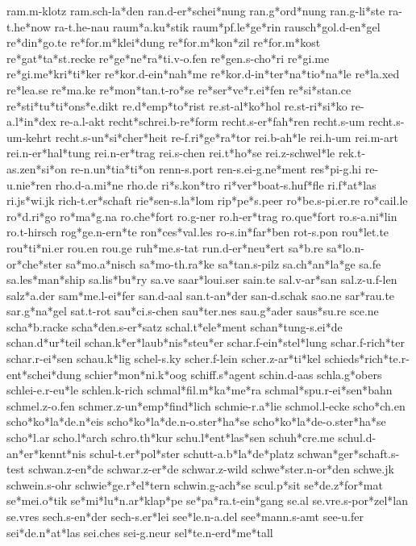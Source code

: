 ram.m-klotz
ram.sch-la*den
ran.d-er*schei*nung
ran.g*ord*nung
ran.g-li*ste
ra-t.he*now
ra-t.he-nau
raum*a.ku*stik
raum*pf.le*ge*rin
rausch*gol.d-en*gel
re*din*go.te
re*for.m*klei*dung
re*for.m*kon*zil
re*for.m*kost
re*gat*ta*st.recke
re*ge*ne*ra*ti.v-o.fen
re*gen.s-cho*ri
re*gi.me
re*gi.me*kri*ti*ker
re*kor.d-ein*nah*me
re*kor.d-in*ter*na*tio*na*le
re*la.xed
re*lea.se
re*ma.ke
re*mon*tan.t-ro*se
re*ser*ve*r.ei*fen
re*si*stan.ce
re*sti*tu*ti*ons*e.dikt
re.d*emp*to*rist
re.st-al*ko*hol
re.st-ri*si*ko
re-a.l*in*dex
re-a.l-akt
recht*schrei.b-re*form
recht.s-er*fah*ren
recht.s-um
recht.s-um-kehrt
recht.s-un*si*cher*heit
re-f.ri*ge*ra*tor
rei.b-ah*le
rei.h-um
rei.m-art
rei.n-er*hal*tung
rei.n-er*trag
rei.s-chen
rei.t*ho*se
rei.z-schwel*le
rek.t-as.zen*si*on
re-n.un*tia*ti*on
renn-s.port
ren-s.ei-g.ne*ment
res*pi-g.hi
re-u.nie*ren
rho.d-a.mi*ne
rho.de
ri*s.kon*tro
ri*ver*boat-s.huf*fle
ri.f*at*las
ri.js*wi.jk
rich-t.er*schaft
rie*sen-s.la*lom
rip*pe*s.peer
ro*be.s-pi.er.re
ro*cail.le
ro*d.ri*go
ro*ma*g.na
ro.che*fort
ro.g-ner
ro.h-er*trag
ro.que*fort
ro.s-a.ni*lin
ro.t-hirsch
rog*ge.n-ern*te
ron*ces*val.les
ro-s.in*far*ben
rot-s.pon
rou*let.te
rou*ti*ni.er
rou.en
rou.ge
ruh*me.s-tat
run.d-er*neu*ert
sa*b.re
sa*lo.n-or*che*ster
sa*mo.a*nisch
sa*mo-th.ra*ke
sa*tan.s-pilz
sa.ch*an*la*ge
sa.fe
sa.les*man*ship
sa.lis*bu*ry
sa.ve
saar*loui.ser
sain.te
sal.v-ar*san
sal.z-u.f-len
salz*a.der
sam*me.l-ei*fer
san.d-aal
san.t-an*der
san-d.schak
sao.ne
sar*rau.te
sar.g*na*gel
sat.t-rot
sau*ci.s-chen
sau*ter.nes
sau.g*ader
saus*su.re
sce.ne
scha*b.racke
scha*den.s-er*satz
schal.t*ele*ment
schan*tung-s.ei*de
schan.d*ur*teil
schan.k*er*laub*nis*steu*er
schar.f-ein*stel*lung
schar.f-rich*ter
schar.r-ei*sen
schau.k*lig
schel-s.ky
scher.f-lein
scher.z-ar*ti*kel
schieds*rich*te.r-ent*schei*dung
schier*mon*ni.k*oog
schiff.s*agent
schin.d-aas
schla.g*obers
schlei-e.r-eu*le
schlen.k-rich
schmal*fil.m*ka*me*ra
schmal*spu.r-ei*sen*bahn
schmel.z-o.fen
schmer.z-un*emp*find*lich
schmie-r.a*lie
schmol.l-ecke
scho*ch.en
scho*ko*la*de.n*eis
scho*ko*la*de.n-o.ster*ha*se
scho*ko*la*de-o.ster*ha*se
scho*l.ar
scho.l*arch
schro.th*kur
schu.l*ent*las*sen
schuh*cre.me
schul.d-an*er*kennt*nis
schul-t.er*pol*ster
schutt-a.b*la*de*platz
schwan*ger*schaft.s-test
schwan.z-en*de
schwar.z-er*de
schwar.z-wild
schwe*ster.n-or*den
schwe.jk
schwein.s-ohr
schwie*ge.r*el*tern
schwin.g-ach*se
scul.p*sit
se*de.z*for*mat
se*mei.o*tik
se*mi*lu*n.ar*klap*pe
se*pa*ra.t-ein*gang
se.al
se.vre.s-por*zel*lan
se.vres
sech.s-en*der
sech-s.er*lei
see*le.n-a.del
see*mann.s-amt
see-u.fer
sei*de.n*at*las
sei.ches
sei-g.neur
sel*te.n-erd*me*tall
